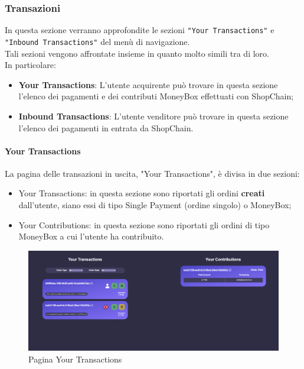         \subsubsection{Transazioni}
        In questa sezione verranno approfondite le sezioni \texttt{"Your Transactions"} e \texttt{"Inbound Transactions"} del menù di navigazione.\\
        Tali sezioni vengono affrontate insieme in quanto molto simili tra di loro.\\
        In particolare:
        \begin{itemize}
            \item \textbf{Your Transactions}: L'utente acquirente può trovare in questa sezione l'elenco dei pagamenti e dei contributi MoneyBox effettuati con ShopChain;
            \item \textbf{Inbound Transactions}: L'utente venditore può trovare in questa sezione l'elenco dei pagamenti in entrata da ShopChain.
        \end{itemize}
        \paragraph{Your Transactions}
        La pagina delle transazioni in uscita, "Your Transactions", è divisa in due sezioni:
        \begin{itemize}
            \item Your Transactions: in questa sezione sono riportati gli ordini \textbf{creati} dall'utente, siano essi di tipo Single Payment (ordine singolo) o MoneyBox;
            \item Your Contributions: in questa sezione sono riportati gli ordini di tipo MoneyBox a cui l'utente ha contribuito.
        \end{itemize}
        \begin{figure}[H]
        \centering
        \includegraphics[scale=0.2]{immagini/Transaction/YourTransaction.png}
        \caption{Pagina Your Transactions}
        \end{figure}
